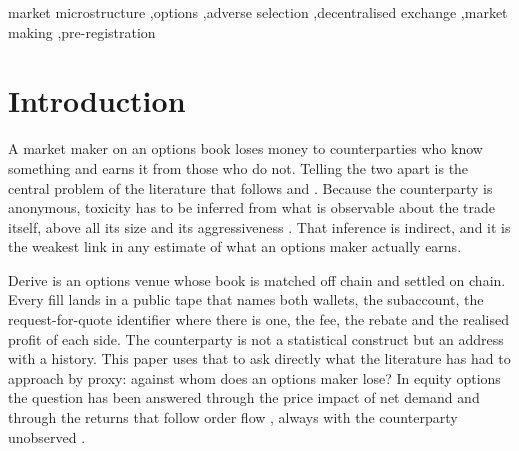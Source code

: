 \documentclass[a4paper,fleqn]{cas-dc}
\begin{document}
\begin{keywords}
market microstructure \sep options \sep adverse selection \sep decentralised exchange \sep market making
\sep pre-registration
\end{keywords}

\maketitle

\section{Introduction}
A market maker on an options book loses money to counterparties who know something and earns it from those
who do not. Telling the two apart is the central problem of the literature that follows
\citet{glosten1985} and \citet{copeland1983}. Because the counterparty is anonymous, toxicity has to be
inferred from what is observable about the trade itself, above all its size and its aggressiveness
\citep{easleyohara1987}. That inference is indirect, and it is the weakest link in any estimate of what an
options maker actually earns.

Derive is an options venue whose book is matched off chain and settled on chain. Every fill lands in a
public tape that names both wallets, the subaccount, the request-for-quote identifier where there is one,
the fee, the rebate and the realised profit of each side. The counterparty is not a statistical construct
but an address with a history. This paper uses that to ask directly what the literature has had to approach
by proxy: against whom does an options maker lose? In equity options the question has been answered through
the price impact of net demand \citep{bollen2004,garleanu2009} and through the returns that follow order
flow \citep{muravyev2016}, always with the counterparty unobserved \citep{easley1998}.
\end{document}
